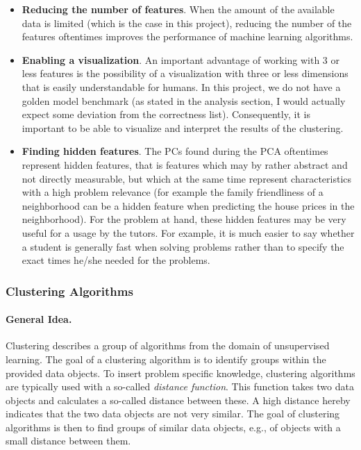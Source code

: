 \begin{itemize}
	\item \textbf{Reducing the number of features}. When the amount of the available data is limited (which is the case in this project), reducing the number of the features oftentimes improves the performance of machine learning algorithms.
	\item \textbf{Enabling a visualization}. An important advantage of working with 3 or less features is the possibility of a visualization with three or less dimensions that is easily understandable for humans. In this project, we do not have a golden model benchmark (as stated in the analysis section, I would actually expect some deviation from the correctness list). Consequently, it is important to be able to visualize and interpret the results of the clustering. 
	\item \textbf{Finding hidden features}. The PCs found during the PCA oftentimes represent hidden features, that is features which may by rather abstract and not directly measurable, but which at the same time represent characteristics with a high problem relevance (for example the family friendliness of a neighborhood can be a hidden feature when predicting the house prices in the neighborhood). For the problem at hand, these hidden features may be very useful for a usage by the tutors. For example, it is much easier to say whether a student is generally fast when solving problems rather than to specify the exact times he/she needed for the problems.   
\end{itemize}

\subsubsection{Clustering Algorithms}

\paragraph{General Idea.} Clustering describes a group of algorithms from the domain of unsupervised learning. The goal of a clustering algorithm is to identify groups within the provided data objects. To insert problem specific knowledge, clustering algorithms are typically used with a so-called \emph{distance function}. This function takes two data objects and calculates a so-called distance between these. A high distance hereby indicates that the two data objects are not very similar. The goal of clustering algorithms is then to find groups of similar data objects, e.g., of objects with a small distance between them.  

